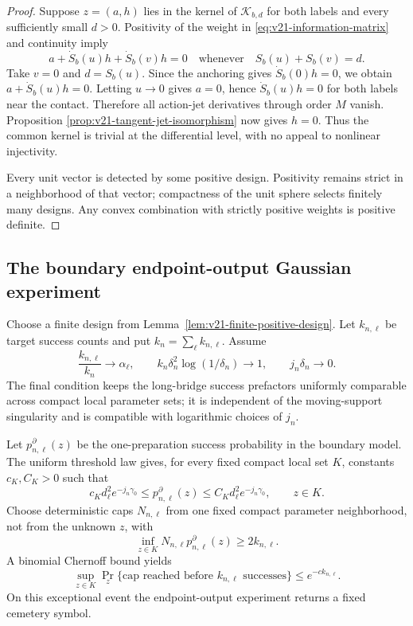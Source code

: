 \begin{proof}
Suppose $z=(a,h)$ lies in the kernel of $\mathcal K_{b,d}$ for both labels
and every sufficiently small $d>0$.  Positivity of the weight in
\eqref{eq:v21-information-matrix} and continuity imply
\begin{equation}\label{eq:v21-kernel-level}
 a+\dot S_b(u)h+\dot S_b(v)h=0
 \quad\text{whenever}\quad S_b(u)+S_b(v)=d.
\end{equation}
Take $v=0$ and $d=S_b(u)$.  Since the anchoring gives
$\dot S_b(0)h=0$, we obtain
$a+\dot S_b(u)h=0$.  Letting $u\to0$ gives $a=0$, hence
$\dot S_b(u)h=0$ for both labels near the contact.  Therefore all action-jet
derivatives through order $M$ vanish.  Proposition
\ref{prop:v21-tangent-jet-isomorphism} now gives $h=0$.  Thus the common
kernel is trivial at the differential level, with no appeal to nonlinear
injectivity.

Every unit vector is detected by some positive design.  Positivity remains
strict in a neighborhood of that vector; compactness of the unit sphere
selects finitely many designs.  Any convex combination with strictly positive
weights is positive definite.
\end{proof}

\subsection{The boundary endpoint-output Gaussian experiment}

Choose a finite design from Lemma~\ref{lem:v21-finite-positive-design}.  Let
$k_{n,\ell}$ be target success counts and put
$k_n=\sum_\ell k_{n,\ell}$.  Assume
\begin{equation}\label{eq:v21-batch-rate}
 \frac{k_{n,\ell}}{k_n}\to\alpha_\ell,
 \qquad
 k_n\delta_n^2\log(1/\delta_n)\to1,
 \qquad
 j_n\delta_n\to0.
\end{equation}
The final condition keeps the long-bridge success prefactors uniformly
comparable across compact local parameter sets; it is independent of the
moving-support singularity and is compatible with logarithmic choices of
$j_n$.

Let $p^\partial_{n,\ell}(z)$ be the one-preparation success probability in
the boundary model.  The uniform threshold law gives, for every fixed compact
local set $K$, constants $c_K,C_K>0$ such that
\begin{equation}\label{eq:v21-uniform-success}
 c_Kd_\ell^2e^{-j_n\gamma_0}
 \le p^\partial_{n,\ell}(z)
 \le C_Kd_\ell^2e^{-j_n\gamma_0},
 \qquad z\in K.
\end{equation}
Choose deterministic caps $N_{n,\ell}$ from one fixed compact parameter
neighborhood, not from the unknown $z$, with
\begin{equation}\label{eq:v21-cap-choice}
 \inf_{z\in K}N_{n,\ell}p^\partial_{n,\ell}(z)
 \ge2k_{n,\ell}.
\end{equation}
A binomial Chernoff bound yields
\begin{equation}\label{eq:v21-cap-tail}
 \sup_{z\in K}\Pr_z\{\text{cap reached before }k_{n,\ell}
 \text{ successes}\}\le e^{-c k_{n,\ell}}.
\end{equation}
On this exceptional event the endpoint-output experiment returns a fixed
cemetery symbol.

